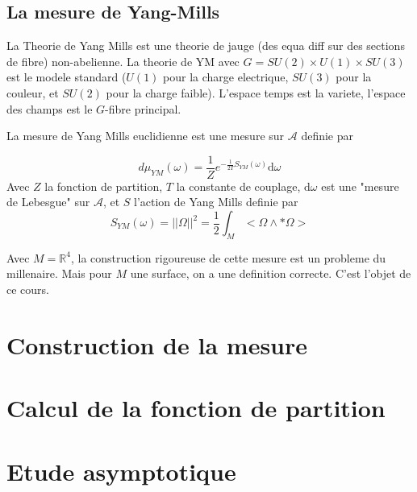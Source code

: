 \documentclass[a4paper]{report}
\theoremstyle{definition}
\theoremstyle{remark}
\begin{document}
\section{La mesure de Yang-Mills}
La Theorie de Yang Mills est une theorie de jauge (des equa diff sur des sections de fibre) non-abelienne. La theorie de YM avec $G = SU(2)\times U(1) \times SU(3)$ est le modele standard ($U(1)$ pour la charge electrique, $SU(3)$ pour la couleur, et $SU(2)$ pour la charge faible). L'espace temps est la variete, l'espace des champs est le $G$-fibre principal.\par \medskip 

La mesure de Yang Mills euclidienne est une mesure sur $\mathcal A$ definie par 

\begin{equation}
    d\mu _{YM} (\omega) = \frac{1}{Z} e^{-\frac{1}{2T} S_{YM}(\omega)} \text{d}\omega
\end{equation}
Avec $Z$ la fonction de partition, $T$ la constante de couplage, $\text{d}\omega$ est une "mesure de Lebesgue" sur $\mathcal A$, et $S$ l'action de Yang Mills definie par  
\begin{equation}
    S_{YM}(\omega) = ||\Omega||^2 = \frac{1}{2} \int_M <\Omega \wedge *\Omega>
\end{equation}

Avec $M = \mathbb{R}^4$, la construction rigoureuse de cette mesure est un probleme du millenaire. Mais pour $M$ une surface, on a une definition correcte. C'est l'objet de ce cours. 
\chapter{Construction de la mesure}

\chapter{Calcul de la fonction de partition}

\chapter{Etude asymptotique}
\end{document}
